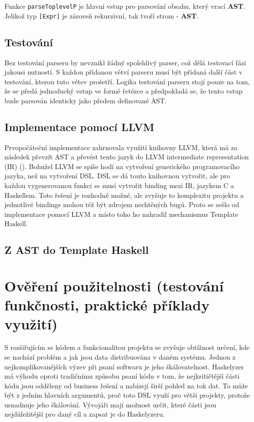 \documentclass[male,czech]{kithesis}
\newcommand{\haskellInline}[1]{\colorbox{gray!10}{\texttt{#1}}}
\begin{document}
Funkce \haskellInline{parseToplevelP} je hlavní vstup pro parsování obsahu,
který vrací \textbf{AST}. Jelikož typ \haskellInline{[Expr]} je zároveň rekurzivní,
tak tvoří strom - \textbf{AST}.

\section{Testování}

Bez testování parseru by nevznikl žádný spolehlivý parser, 
což dělá testovací fázi jakousi nutností.
S každou přidanou větví parseru musí být přidaná další část v testování,
kterou tuto větev prošetří. Logika testování parseru stojí pouze na tom,
že se předá jednoduchý vstup ve formě řetězce 
a předpokladá se, že tento vstup bude parsován identicky jako předem definované AST.

\section{Implementace pomocí LLVM}

Prvopočáteční implementace zahrnovala využití knihovny LLVM, která 
má za následek převzít AST a převést tento jazyk do LLVM intermediate representation (IR)
(\cite{IntroToLLVM}).
Bohužel LLVM se spíše hodí na vytvoření generického programovacího jazyka, než na vytvoření
DSL. DSL se dá touto knihovnou vytvořit, ale pro každou vygenerovanou funkci se musí
vytvořit binding mezi IR, jazykem C a Haskellem. Toto řešení je rozhodně možné, 
ale zvyšuje to komplexitu projektu a jednotlivé bindings mohou též být zdrojem 
nechtěných bugů. Proto se sešlo od implementace pomocí LLVM a místo toho ho nahradil 
mechanismus Template Haskell.

\section{Z AST do Template Haskell}

\chapter{Ověření použitelnosti (testování funkčnosti, praktické příklady využití)}

S rozšiřujícím se kódem a funkcionalitou projektu se zvyšuje obtížnost určení, 
kde se nachází problém a jak jsou data distribuována v daném systému. 
Jednou z nejkomplikovanějších výzev při psaní softwaru je jeho škálovatelnost. 
Haskelyzer má výhodu oproti tradičnímu způsobu psaní kódu v tom, 
že nejkritičtější části kódu jsou odděleny od business řešení a nabízejí širší pohled na tok dat. 
To může být z jedním hlavních argumentů, proč toto DSL využí pro větší projekty,
protože usnadnuje jeho škálování.
Vývojáři mají možnost určit, které části jsou nejdůležitější pro daný cíl a zapsat je do Haskelyzeru.
\end{document}

